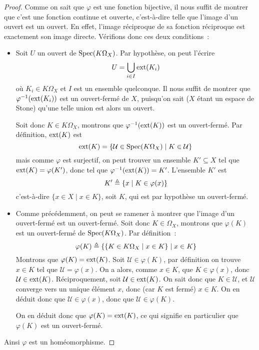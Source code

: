 \begin{proof}
  Comme on sait que $\varphi$ est une fonction bijective, il nous suffit de
  montrer que c'est une fonction continue et ouverte, c'est-à-dire telle que
  l'image d'un ouvert est un ouvert. En effet, l'image réciproque de sa fonction
  réciproque est exactement son image directe. Vérifions donc ces deux
  conditions~:
  \begin{itemize}
  \item Soit $U$ un ouvert de $\operatorname{Spec}(K\Omega_X)$. Par hypothèse, on peut
    l'écrire
    \[U = \bigcup_{i\in I} \operatorname{ext}(K_i)\]
    où $K_i\in K\Omega_X$ et $I$ est un ensemble quelconque. Il nous suffit
    de montrer que $\varphi^{-1}(\operatorname{ext}(K_i))$ est un ouvert-fermé de $X$,
    puisqu'on sait ($X$ étant un espace de Stone) qu'une telle union est alors
    un ouvert.

    Soit donc $K\in K\Omega_X$, montrons que $\varphi^{-1}(\operatorname{ext}(K))$ est un
    ouvert-fermé. Par définition, $\operatorname{ext}(K)$ est
    \[\operatorname{ext}(K) = \{\mathcal U \in \operatorname{Spec}(K\Omega_X)\mid K \in \mathcal U\}\]
    mais comme $\varphi$ est surjectif, on peut trouver un ensemble
    $K'\subseteq X$ tel que $\operatorname{ext}(K) = \varphi(K')$, donc tel que
    $\varphi^{-1}(\operatorname{ext}(K)) = K'$. L'ensemble $K'$ est
    \[K' \triangleq \{x \mid K \in \varphi(x)\}\]
    c'est-à-dire $\{x\in X\mid x\in K\}$, soit $K$, qui est par hypothèse
    un ouvert-fermé.
  \item Comme précédemment, on peut se ramener à montrer que l'image d'un
    ouvert-fermé est un ouvert-fermé. Soit donc $K\in\Omega_X$, montrons que
    $\varphi(K)$ est un ouvert-fermé de $\operatorname{Spec}(K\Omega_X)$. Par définition~:
    \[\varphi(K) \triangleq \{\{K \in K\Omega_X\mid x \in K\}\mid x \in K\}\]
    Montrons que $\varphi(K) = \operatorname{ext}(K)$. Soit $\mathcal U \in \varphi(K)$,
    par définition on trouve $x\in K$ tel que $\mathcal U = \varphi(x)$.
    On a alors, comme $x\in K$, que $K\in \varphi(x)$, donc
    $\mathcal U \in \operatorname{ext}(K)$. Réciproquement, soit $\mathcal U \in \operatorname{ext}(K)$.
    On sait donc que $K\in \mathcal U$, et $\mathcal U$ converge vers un
    unique élément $x$, donc (car $K$ est fermé) $x\in K$. On en déduit donc
    que $\mathcal U \in\varphi(x)$, donc que $\mathcal U \in \varphi(K)$.

    On en déduit donc que $\varphi(K) = \operatorname{ext}(K)$, ce qui signifie en particulier
    que $\varphi(K)$ est un ouvert-fermé.
  \end{itemize}

  Ainsi $\varphi$ est un homéomorphisme.
\end{proof}

